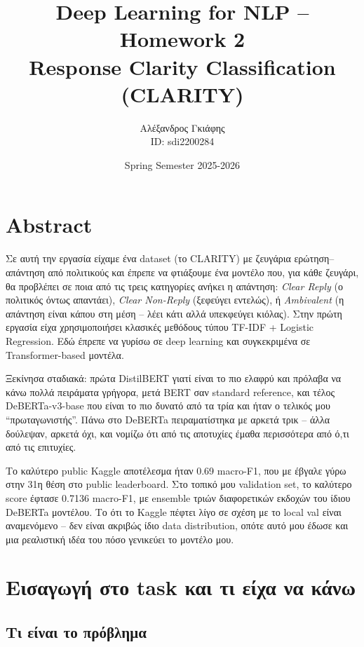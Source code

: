 \documentclass[12pt]{fphw}
\title{Deep Learning for NLP -- Homework 2 \\ Response Clarity Classification (CLARITY)}
\author{Αλέξανδρος Γκιάφης \\ ID: sdi2200284}
\date{Spring Semester 2025-2026}
\institute{National and Kapodistrian University of Athens \\ Department of Informatics and Telecommunications}
\begin{document}
\maketitle

{
  \hypersetup{linkcolor=black}
  \tableofcontents
}
\newpage

\section{Abstract}

Σε αυτή την εργασία είχαμε ένα dataset (το CLARITY) με ζευγάρια ερώτηση--απάντηση από πολιτικούς και έπρεπε να φτιάξουμε ένα μοντέλο που, για κάθε ζευγάρι, θα προβλέπει σε ποια από τις τρεις κατηγορίες ανήκει η απάντηση: \emph{Clear Reply} (ο πολιτικός όντως απαντάει), \emph{Clear Non-Reply} (ξεφεύγει εντελώς), ή \emph{Ambivalent} (η απάντηση είναι κάπου στη μέση -- λέει κάτι αλλά υπεκφεύγει κιόλας). Στην πρώτη εργασία είχα χρησιμοποιήσει κλασικές μεθόδους τύπου TF-IDF + Logistic Regression. Εδώ έπρεπε να γυρίσω σε deep learning και συγκεκριμένα σε Transformer-based μοντέλα.

Ξεκίνησα σταδιακά: πρώτα DistilBERT \cite{sanh2019distilbert} γιατί είναι το πιο ελαφρύ και πρόλαβα να κάνω πολλά πειράματα γρήγορα, μετά BERT \cite{devlin2019bert} σαν standard reference, και τέλος DeBERTa-v3-base \cite{he2021deberta} που είναι το πιο δυνατό από τα τρία και ήταν ο τελικός μου ``πρωταγωνιστής''. Πάνω στο DeBERTa πειραματίστηκα με αρκετά τρικ -- άλλα δούλεψαν, αρκετά όχι, και νομίζω ότι από τις αποτυχίες έμαθα περισσότερα από ό,τι από τις επιτυχίες.

Το καλύτερο public Kaggle αποτέλεσμα ήταν 0.69 macro-F1, που με έβγαλε γύρω στην 31η θέση στο public leaderboard. Στο τοπικό μου validation set, το καλύτερο score έφτασε 0.7136 macro-F1, με ensemble τριών διαφορετικών εκδοχών του ίδιου DeBERTa μοντέλου. Το ότι το Kaggle πέφτει λίγο σε σχέση με το local val είναι αναμενόμενο -- δεν είναι ακριβώς ίδιο data distribution, οπότε αυτό μου έδωσε και μια ρεαλιστική ιδέα του πόσο γενικεύει το μοντέλο μου.

\section{Εισαγωγή στο task και τι είχα να κάνω}

\subsection{Τι είναι το πρόβλημα}
\end{document}
